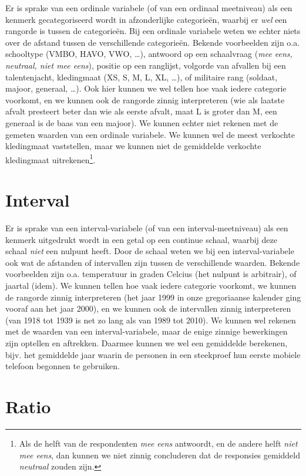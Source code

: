 \documentclass[
]{book}
\begin{document}
Er is sprake van een ordinale variabele (of van een ordinaal meetniveau)
als een kenmerk gecategoriseerd wordt in afzonderlijke categorieën,
waarbij er \emph{wel} een rangorde is tussen de categorieën. Bij een ordinale
variabele weten we echter niets over de afstand tussen de verschillende
categorieën. Bekende voorbeelden zijn o.a. schooltype (VMBO, HAVO, VWO,
\ldots), antwoord op een schaalvraag (\emph{mee eens, neutraal, niet mee eens}),
positie op een ranglijst, volgorde van afvallen bij een talentenjacht,
kledingmaat (XS, S, M, L, XL, \ldots), of militaire rang (soldaat, majoor,
generaal, \ldots). Ook hier kunnen we wel tellen hoe vaak iedere categorie
voorkomt, en we kunnen ook de rangorde zinnig interpreteren (wie als
laatste afvalt presteert beter dan wie als eerste afvalt, maat L is
groter dan M, een generaal is de baas van een majoor). We kunnen echter
niet rekenen met de gemeten waarden van een ordinale variabele. We
kunnen wel de meest verkochte kledingmaat vaststellen, maar we kunnen
niet de gemiddelde verkochte kledingmaat uitrekenen\footnote{Als de helft van de respondenten \emph{mee eens} antwoordt, en de andere helft \emph{niet mee eens}, dan kunnen we niet zinnig concluderen dat de responsies gemiddeld \emph{neutraal} zouden zijn.}.

\section{Interval}\label{sec:interval}

Er is sprake van een interval-variabele (of van een interval-meetniveau)
als een kenmerk uitgedrukt wordt in een getal op een continue schaal,
waarbij deze schaal \emph{niet} een nulpunt heeft. Door de schaal weten we
bij een interval-variabele ook wat de afstanden of intervallen zijn
tussen de verschillende waarden. Bekende voorbeelden zijn o.a.
temperatuur in graden Celcius (het nulpunt is arbitrair), of jaartal
(idem). We kunnen tellen hoe vaak iedere categorie voorkomt, we kunnen
de rangorde zinnig interpreteren (het jaar 1999 in onze gregoriaanse
kalender ging vooraf aan het jaar 2000), en we kunnen ook de intervallen
zinnig interpreteren (van 1918 tot 1939 is net zo lang als van 1989 tot
2010). We kunnen wel rekenen met de waarden van een interval-variabele,
maar de enige zinnige bewerkingen zijn optellen en aftrekken. Daarmee
kunnen we wel een gemiddelde berekenen, bijv. het gemiddelde jaar waarin de
personen in een steekproef hun eerste mobiele telefoon begonnen te gebruiken.

\section{Ratio}\label{sec:ratio}
\end{document}
